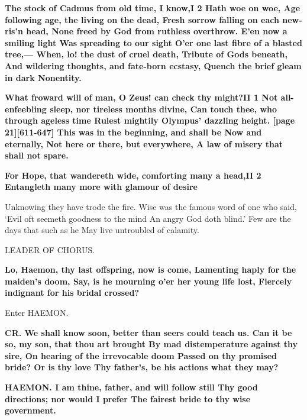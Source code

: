 \documentclass[11pt,letter]{book}
\begin{document}
\par \textbf{The stock of Cadmus from old time, I know,I 2 Hath woe on woe, Age following age, the living on the dead, Fresh sorrow falling on each new-ris’n head, None freed by God from ruthless overthrow. E’en now a smiling light Was spreading to our sight O’er one last fibre of a blasted tree,— When, lo! the dust of cruel death, Tribute of Gods beneath, And wildering thoughts, and fate-born ecstasy, Quench the brief gleam in dark Nonentity.}
\par 

\par \textbf{What froward will of man, O Zeus! can check thy might?II 1 Not all-enfeebling sleep, nor tireless months divine, Can touch thee, who through ageless time Rulest mightily Olympus’ dazzling height. [page 21][611-647] This was in the beginning, and shall be Now and eternally, Not here or there, but everywhere, A law of misery that shall not spare.}
\par 

\par \textbf{For Hope, that wandereth wide, comforting many a head,II 2 Entangleth many more with glamour of desire}
\par   Unknowing they have trode the fire. Wise was the famous word of one who said, ‘Evil oft seemeth goodness to the mind An angry God doth blind.’ Few are the days that such as he May live untroubled of calamity.

\par  LEADER OF CHORUS.

\par \textbf{Lo, Haemon, thy last offspring, now is come, Lamenting haply for the maiden’s doom, Say, is he mourning o’er her young life lost, Fiercely indignant for his bridal crossed?}
\par 

\par  Enter HAEMON.

\par \textbf{CR. We shall know soon, better than seers could teach us. Can it be so, my son, that thou art brought By mad distemperature against thy sire, On hearing of the irrevocable doom Passed on thy promised bride? Or is thy love Thy father’s, be his actions what they may?}
\par 

\par \textbf{HAEMON. I am thine, father, and will follow still Thy good directions; nor would I prefer The fairest bride to thy wise government.}
\par 
\end{document}
